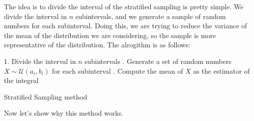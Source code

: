 \documentclass{report}
\begin{document}
The idea is to divide the interval of the stratified sampling is pretty simple. We divide the interval in \(n\) subintervals, and we generate a sample of random numbers for each subinterval. Doing this, we are trying to reduce the variance of the mean of the distribution we are considering, so the sample is more representative of the distribution. The alrogithm is as follows:

\begin{center}
	\begin{minipage}{0.7\linewidth} %
		\begin{algorithm}[H]
			1. Divide the interval in \(n\) subintervals . Generate a set of random numbers \(X \sim \mathcal{U}(a_i,b_i)\) for each subinterval . Compute the mean of \(X\) as the estimator of the integral \;
			\caption{Stratified Sampling method} %
			\label{alg:stratifiedsampling}   %
		\end{algorithm}
	\end{minipage}
\end{center}

Now let's show why this method works.
\end{document}
